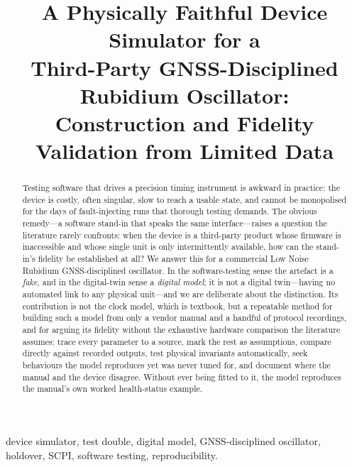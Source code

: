\documentclass[conference]{IEEEtran}
\begin{document}
\title{A Physically Faithful Device Simulator for a\\
Third-Party GNSS-Disciplined Rubidium Oscillator:\\
Construction and Fidelity Validation from Limited Data}

\author{
}

\maketitle

\begin{abstract}
Testing software that drives a precision timing instrument is awkward in
practice: the device is costly, often singular, slow to reach a usable
state, and cannot be monopolised for the days of fault-injecting runs
that thorough testing demands. The obvious remedy---a software stand-in
that speaks the same interface---raises a question the literature rarely
confronts: when the device is a third-party product whose firmware is
inaccessible and whose single unit is only intermittently available, how
can the stand-in's fidelity be established at all? We answer this for a
commercial Low Noise Rubidium GNSS-disciplined oscillator. In the
software-testing sense the artefact is a \emph{fake}, and in the
digital-twin sense a \emph{digital model}; it is not a digital
twin---having no automated link to any physical unit---and we are
deliberate about the distinction. Its contribution is not the clock
model, which is textbook, but a repeatable method for building such a
model from only a vendor manual and a handful of protocol recordings,
and for arguing its fidelity without the exhaustive hardware comparison
the literature assumes: trace every parameter to a source, mark the rest
as assumptions, compare directly against recorded outputs, test physical
invariants automatically, seek behaviours the model reproduces yet was
never tuned for, and document where the manual and the device disagree.
Without ever being fitted to it, the model reproduces the manual's own
worked health-status example.
\end{abstract}

\begin{IEEEkeywords}
device simulator, test double, digital model, GNSS-disciplined
oscillator, holdover, SCPI, software testing, reproducibility.
\end{IEEEkeywords}
\end{document}
